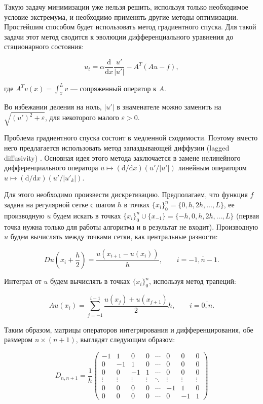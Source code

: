 Такую задачу минимизации уже нельзя решить, используя только необходимое условие экстремума, и необходимо применять другие методы оптимизации. Простейшим способом будет использовать метод градиентного спуска. Для такой задачи этот метод сводится к эволюции дифференциального уравнения до стационарного состояния:

\begin{equation}
u_t = \alpha \frac{\mathrm{d}}{\mathrm{d}x} \frac{u'}{|u'|} - A^T (A u - f),
\end{equation}

где $A^T v(x) = \int_x^L v$ --- сопряженный оператор к $A$.

Во избежании деления на ноль, $|u'|$ в знаменателе можно заменить на $\sqrt{(u')^2 + \varepsilon}$, для некоторого малого $\varepsilon > 0$.

Проблема градиентного спуска состоит в медленной сходимости. Поэтому вместо него предлагается использовать метод запаздывающей диффузии (lagged diffusivity) \cite{lagged_diff_1, lagged_diff_2}. Основная идея этого метода заключается в замене нелинейного дифференциального оператора $u \mapsto (\mathrm{d} / \mathrm{d}x)(u'/|u'|)$ линейным оператором $u \mapsto (\mathrm{d} / \mathrm{d}x)(u'/|u'_k|)$.

Для этого необходимо произвести дискретизацию. Предполагаем, что функция $f$ задана на регулярной сетке с шагом $h$ в точках $\{x_i\}_0^n = \{0, h, 2h, \ldots, L\}$, ее производную $u$ будем искать в точках $\{x_i\}_0^n \cup \{x_{-1}\} = \{-h, 0, h, 2h, \ldots, L\}$ (первая точка нужна только для работы алгоритма и в результат не входит). Производную $u$ будем вычислять между точками сетки, как центральные разности:

\begin{equation}
D u(x_i + \frac{h}{2}) = \frac{u(x_{i+1} - u(x_i))}{h}, \qquad i = \overline{-1, n-1}. 
\end{equation}

Интеграл от $u$ будем вычислять в точках $\{x_i\}_0^n$, используя метод трапеций:

\begin{equation}
A u(x_i) = \displaystyle\sum_{j=-1}^{i-1} \frac{u(x_j) + u(x_{j+1})}{2} h, \qquad i = \overline{0, n}.
\end{equation}

Таким образом, матрицы операторов интегрирования и дифференцирования, обе размером $n \times (n + 1)$, выглядят следующим образом:   

\begin{equation}
D_{n, n+1} = \frac{1}{h}
\begin{pmatrix}
-1 &  1 &  0 & 0 & \cdots &  0 &  0 &  0 \\
 0 & -1 &  1 & 0 & \cdots &  0 &  0 &  0 \\
 0 &  0 & -1 & 1 & \cdots &  0 &  0 &  0 \\
\vdots & \vdots & \vdots & \vdots & \ddots & \vdots & \vdots & \vdots \\
 0 &  0 &  0 & 0 & \cdots & -1 &  1 &  0 \\
 0 &  0 &  0 & 0 & \cdots &  0 & -1 &  1 
\end{pmatrix}
\end{equation}

